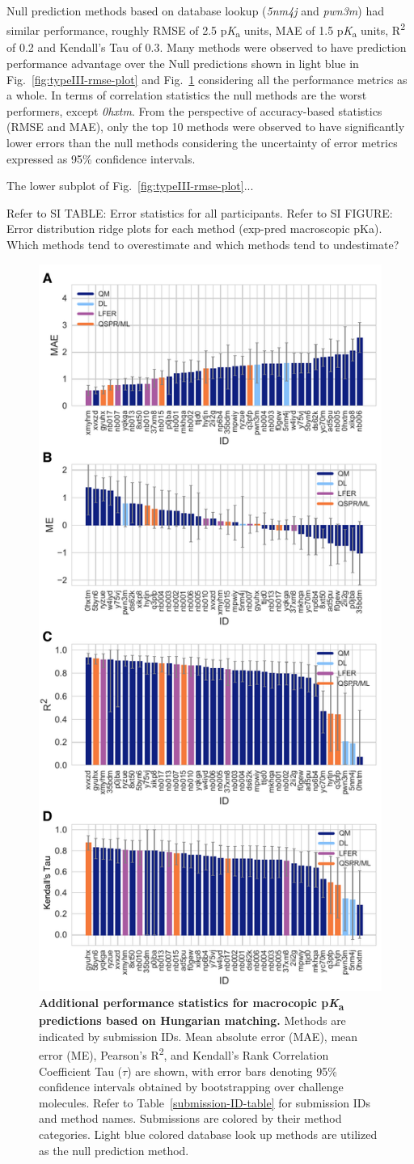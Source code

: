 \documentclass[9pt,lineno,final]{elife}
\newcommand{\pKa}{p\textit{K}\textsubscript{a}}
\begin{document}
Null prediction methods based on database lookup (\textit{5nm4j} and \textit{pwn3m}) had similar performance, roughly RMSE of 2.5 \pKa{} units, MAE of 1.5 \pKa{} units, R\textsuperscript{2} of 0.2 and Kendall's Tau of 0.3.
Many methods were observed to have prediction performance advantage over the Null predictions shown in light blue in Fig.~\ref{fig:typeIII-rmse-plot} and Fig.~\ref{fig:typeIII-statistics} considering all the performance metrics as a whole.
In terms of correlation statistics the null methods are the worst performers, except \textit{0hxtm}.
From the perspective of accuracy-based statistics (RMSE and MAE), only the top 10 methods were observed to have significantly lower errors than the null methods considering the uncertainty of error metrics expressed as 95\% confidence intervals.

The lower subplot of Fig.~\ref{fig:typeIII-rmse-plot}...

Refer to SI TABLE: Error statistics for all participants.  
Refer to SI FIGURE: Error distribution ridge plots for each method  (exp-pred macroscopic pKa). Which methods tend to overestimate and which methods tend to undestimate?  

\begin{figure}[ht!]
\centering
\includegraphics[width=0.5\linewidth]{figures/typeIII_statistics.pdf}
\caption{{\bf Additional performance statistics for macrocopic \pKa{} predictions based on Hungarian matching.} 
Methods are indicated by submission IDs. 
Mean absolute error (MAE), mean error (ME), Pearson’s R\textsuperscript{2}, and Kendall’s Rank Correlation Coefficient Tau ($\tau$) are shown, with error bars denoting 95\% confidence intervals obtained by bootstrapping over challenge molecules. Refer to Table~\ref{submission-ID-table} for submission IDs and method names. Submissions are colored by their method categories. Light blue colored database look up methods are utilized as the null prediction method.
}
\label{fig:typeIII-statistics}
\end{figure}
\end{document}
